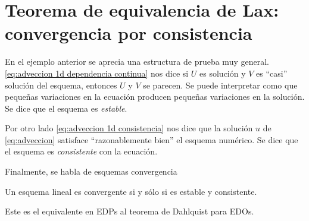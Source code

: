 \section{Teorema de equivalencia de Lax: convergencia por consistencia}

En el ejemplo anterior se aprecia una estructura de prueba muy general.
\eqref{eq:adveccion 1d dependencia continua} nos dice si $U$ es solución y $V$ es ``casi'' solución del esquema, entonces $U$ y $V$ se parecen.
Se puede interpretar como que pequeñas variaciones en la ecuación producen pequeñas variaciones en la solución.
Se dice que el esquema es \emph{estable}.
\begin{definicion}

\end{definicion}
Por otro lado \eqref{eq:adveccion 1d consistencia} nos dice que la solución $u$ de \eqref{eq:adveccion} satisface ``razonablemente bien'' el esquema numérico. Se dice que el esquema es \emph{consistente} con la ecuación.
\begin{definicion}

\end{definicion}
Finalmente, se habla de esquemas convergencia
\begin{definicion}

\end{definicion}


\begin{teorema}
    Un esquema lineal es convergente si y sólo si es estable y consistente.
\end{teorema}

Este es el equivalente en EDPs al teorema de Dahlquist para EDOs.